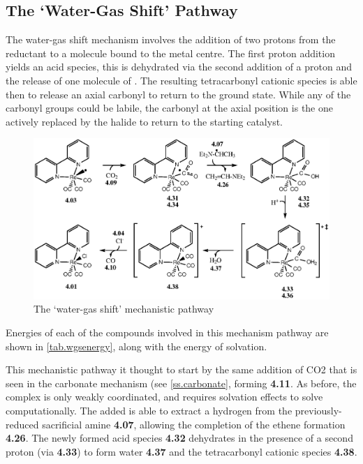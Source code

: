 \FloatBarrier

\subsection{The `Water-Gas Shift' Pathway}\label{ss.watergas}
The water-gas shift mechanism involves the addition of two protons from the reductant to a  molecule bound to the metal centre. The first proton addition yields an acid species, this is dehydrated via the second addition of a proton and the release of one molecule of . The resulting tetracarbonyl cationic species is able then to release an axial carbonyl to return to the ground state. While any of the carbonyl groups could be labile, the carbonyl at the axial position is the one actively replaced by the halide to return to the starting catalyst\autocite{shaver1992}. 

\begin{figure}[!htb]
 \begin{center}
  \includegraphics[clip=true, width=\textwidth, keepaspectratio]{images/watergas.eps}
 \end{center}
\caption{The `water-gas shift' mechanistic pathway}
\label{fig.watergas}
\end{figure} 

Energies of each of the compounds involved in this mechanism pathway are shown in \autoref{tab.wgsenergy}, along with the energy of solvation.




This mechanistic pathway it thought to start by the same addition of CO2 that is seen in the carbonate mechanism (see \autoref{ss.carbonate}, forming \textbf{4.11}.  As before, the complex is only weakly coordinated, and requires solvation effects to solve computationally. The added  is able to extract a hydrogen from the previously-reduced sacrificial amine \textbf{4.07}, allowing the completion of the ethene formation \textbf{4.26}. The newly formed acid species \textbf{4.32} dehydrates in the presence of a second proton (via \textbf{4.33}) to form water \textbf{4.37} and the tetracarbonyl cationic species \textbf{4.38}. 

